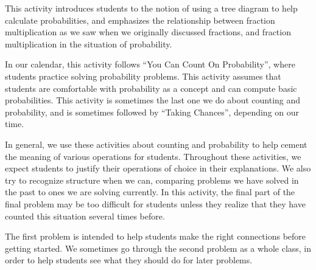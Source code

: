 \documentclass{ximera}
\begin{document}
\begin{instructorNotes}
This activity introduces students to the notion of using a tree diagram to help calculate probabilities, and emphasizes the relationship between fraction multiplication as we saw when we originally discussed fractions, and fraction multiplication in the situation of probability.  

In our calendar, this activity follows ``You Can Count On Probability'', where students practice solving probability problems.  This activity assumes that students are comfortable with probability as a concept and can compute basic probabilities.  This activity is sometimes the last one we do about counting and probability, and is sometimes followed by ``Taking Chances'', depending on our time.

In general, we use these activities about counting and probability to help cement the meaning of various operations for students.  Throughout these activities, we expect students to justify their operations of choice in their explanations.  We also try to recognize structure when we can, comparing problems we have solved in the past to ones we are solving currently.  In this activity, the final part of the final problem may be too difficult for students unless they realize that they have counted this situation several times before.

The first problem is intended to help students make the right connections before getting started.  We sometimes go through the second problem as a whole class, in order to help students see what they should do for later problems.


\end{instructorNotes}
\end{document}
